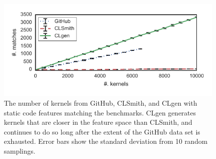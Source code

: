 \begin{figure}
  \includegraphics[width=\columnwidth]{img/closeness} %
  \caption[Number of kernels matching benchmark features]{%
    The number of kernels from GitHub, CLSmith, and CLgen with static code features matching the benchmarks. CLgen generates kernels that are closer in the feature space than CLSmith, and continues to do so long after the extent of the GitHub data set is exhausted. Error bars show the standard deviation from 10 random samplings.%
  }%
  \label{fig:clgen-nearest-neighbour}
\end{figure}
